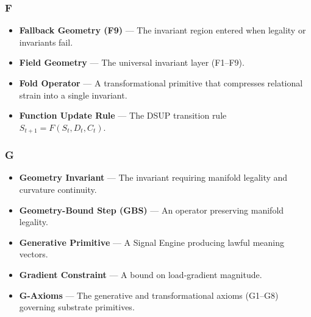 \subsubsection*{F}
\begin{itemize}
    \item \textbf{Fallback Geometry (F9)} — The invariant region entered when
    legality or invariants fail.

    \item \textbf{Field Geometry} — The universal invariant layer (F1–F9).

    \item \textbf{Fold Operator} — A transformational primitive that compresses
    relational strain into a single invariant.

    \item \textbf{Function Update Rule} — The DSUP transition rule
    $S_{t+1} = F(S_t, D_t, C_t)$.
\end{itemize}


\subsubsection*{G}
\begin{itemize}
    \item \textbf{Geometry Invariant} — The invariant requiring manifold legality
    and curvature continuity.

    \item \textbf{Geometry-Bound Step (GBS)} — An operator preserving manifold
    legality.

    \item \textbf{Generative Primitive} — A Signal Engine producing lawful
    meaning vectors.

    \item \textbf{Gradient Constraint} — A bound on load‑gradient magnitude.

    \item \textbf{G-Axioms} — The generative and transformational axioms (G1–G8)
    governing substrate primitives.
\end{itemize}


